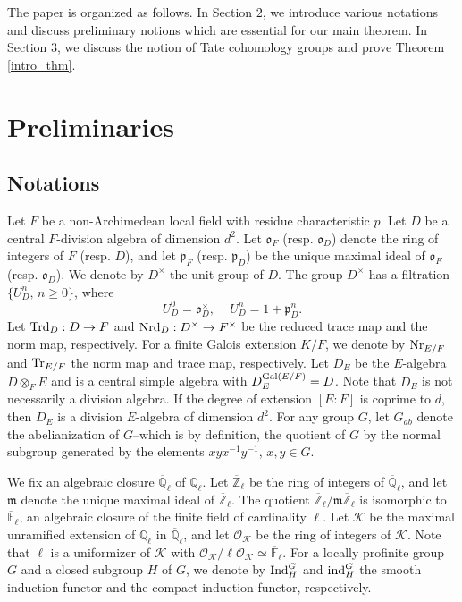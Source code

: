 \documentclass[10pt, reqno]{amsart}
\theoremstyle{plain}
\numberwithin{equation}{section}
\begin{document}
The paper is organized as follows. In Section $2$, we introduce various notations and discuss preliminary notions which are essential for our main theorem. In Section $3$, we discuss the notion of Tate cohomology groups and prove Theorem \ref{intro_thm}. 


\section{Preliminaries}
\subsection{Notations}
Let $F$ be a non-Archimedean local field with residue characteristic $p$. Let $D$ be a central $F$-division algebra of dimension $d^2$. Let $\mathfrak{o}_F$ (resp. $\mathfrak{o}_D$) denote the ring of integers of $F$ (resp. $D$), and let $\mathfrak{p}_F$ (resp. $\mathfrak{p}_D$) be the unique maximal ideal of $\mathfrak{o}_F$ (resp. $\mathfrak{o}_D$). We denote by $D^\times$ the unit group of $D$. The group $D^\times$ has a filtration $\{U_{D}^n,\,n\geq 0\}$, where 
$$ U_{D}^0 = \mathfrak{o}_D^\times,\,\,\,\,\,\,\, U_D^{n} = 1+\mathfrak{p}_D^n.$$ 
Let ${\rm Trd}_D:D\rightarrow F$ and ${\rm Nrd}_D:D^\times\rightarrow F^\times$ be the reduced trace map and the norm map, respectively. For a finite Galois extension $K/F$, we denote by ${\rm Nr}_{E/F}$ and ${\rm Tr}_{E/F}$ the norm map and trace map, respectively. Let $D_E$ be the $E$-algebra $D\otimes_F E$ and is a central simple algebra with $D_E^{{\rm Gal}(E/F)}=D$. Note that $D_E$ is not necessarily a division algebra. If the degree of extension $[E:F]$ is coprime to $d$, then $D_E$ is a division $E$-algebra of dimension $d^2$. For any group $G$, let $G_{ab}$ denote the abelianization of $G$--which is by definition, the quotient of $G$ by the normal subgroup generated by the elements $xyx^{-1}y^{-1}$, $x,y\in G$.

We fix an algebraic closure $\overline{\mathbb{Q}}_\ell$ of $\mathbb{Q}_\ell$.  Let $\overline{\mathbb{Z}}_\ell$ be the ring of integers of $\overline{\mathbb{Q}}_\ell$, and let $\mathfrak{m}$ denote the unique maximal ideal of $\overline{\mathbb{Z}}_\ell$. The quotient $\overline{\mathbb{Z}}_\ell/\mathfrak{m}\overline{\mathbb{Z}}_\ell$ is isomorphic to $\overline{\mathbb{F}}_\ell$, an algebraic closure of the finite field of cardinality $\ell$. Let $\mathcal{K}$ be the maximal unramified extension of $\mathbb{Q}_\ell$ in $\overline{\mathbb{Q}}_\ell$, and let $\mathcal{O}_{\mathcal{K}}$ be the ring of integers of $\mathcal{K}$. Note that $\ell$ is a uniformizer of $\mathcal{K}$ with $\mathcal{O}_{\mathcal{K}}/\ell\mathcal{O}_{\mathcal{K}}\simeq \overline{\mathbb{F}}_\ell$.
For a locally profinite group $G$ and a closed subgroup $H$ of $G$, we denote by ${\rm Ind}_H^G$ and ${\rm ind}_H^G$ the smooth induction functor and the compact induction functor, respectively.  
\end{document}

